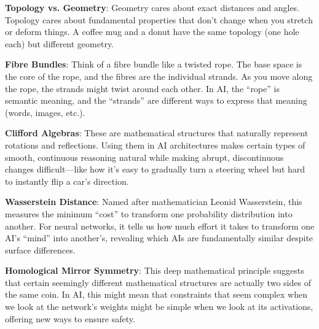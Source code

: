 \documentclass[acmsmall,screen]{acmart}
\begin{document}
\textbf{Topology vs. Geometry}: Geometry cares about exact distances and angles. Topology cares about fundamental properties that don't change when you stretch or deform things. A coffee mug and a donut have the same topology (one hole each) but different geometry.

\textbf{Fibre Bundles}: Think of a fibre bundle like a twisted rope. The base space is the core of the rope, and the fibres are the individual strands. As you move along the rope, the strands might twist around each other. In AI, the ``rope'' is semantic meaning, and the ``strands'' are different ways to express that meaning (words, images, etc.).

\textbf{Clifford Algebras}: These are mathematical structures that naturally represent rotations and reflections. Using them in AI architectures makes certain types of smooth, continuous reasoning natural while making abrupt, discontinuous changes difficult—like how it's easy to gradually turn a steering wheel but hard to instantly flip a car's direction.

\textbf{Wasserstein Distance}: Named after mathematician Leonid Wasserstein, this measures the minimum ``cost'' to transform one probability distribution into another. For neural networks, it tells us how much effort it takes to transform one AI's ``mind'' into another's, revealing which AIs are fundamentally similar despite surface differences.

\textbf{Homological Mirror Symmetry}: This deep mathematical principle suggests that certain seemingly different mathematical structures are actually two sides of the same coin. In AI, this might mean that constraints that seem complex when we look at the network's weights might be simple when we look at its activations, offering new ways to ensure safety.
\end{document}
